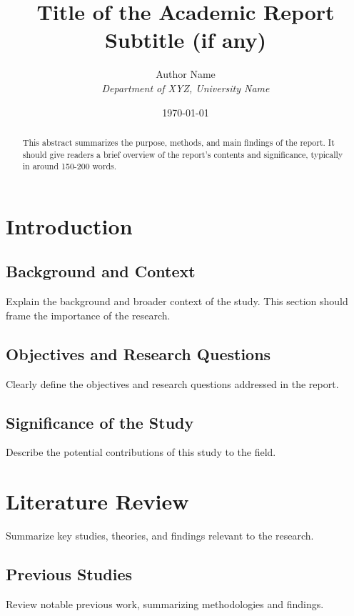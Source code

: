 \documentclass[12pt, a4paper]{report}
\title{\textbf{Title of the Academic Report} \\ \large Subtitle (if any)}
\author{Author Name \\ \textit{Department of XYZ, University Name}}
\date{\today}
\begin{document}
\maketitle
\thispagestyle{empty}  %

\begin{abstract}
\noindent This abstract summarizes the purpose, methods, and main findings of the report. It should give readers a brief overview of the report’s contents and significance, typically in around 150-200 words.
\end{abstract}

\clearpage
\tableofcontents
\thispagestyle{empty}  %
\newpage

\listoffigures
\listoftables
\newpage

\chapter{Introduction}
\section{Background and Context}
Explain the background and broader context of the study. This section should frame the importance of the research.

\section{Objectives and Research Questions}
Clearly define the objectives and research questions addressed in the report.

\section{Significance of the Study}
Describe the potential contributions of this study to the field.

\chapter{Literature Review}
Summarize key studies, theories, and findings relevant to the research.
\section{Previous Studies}
Review notable previous work, summarizing methodologies and findings.
\end{document}
